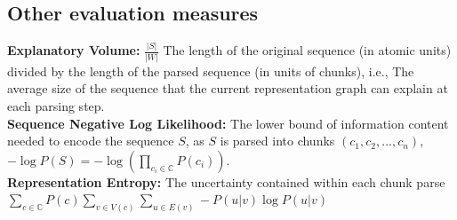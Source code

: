 \documentclass{article} %
\theoremstyle{remark}
\begin{document}

\subsection{Other evaluation measures}
\textbf{Explanatory Volume:} $\frac{|S|}{|W|}$ The length of the original sequence (in atomic units) divided by the length of the parsed sequence (in units of chunks), i.e., The average size of the sequence that the current representation graph can explain at each parsing step. \\ %
\textbf{Sequence Negative Log Likelihood:} The lower bound of information content needed to encode the sequence $S$, as $S$ is parsed into chunks $(c_1, c_2, ..., c_n)$, $-\log P(S) = -\log (\prod_{c_i \in \mathbb{C}} P(c_i))$.  \\
\textbf{Representation Entropy:} The uncertainty contained within each chunk parse $\sum_{c \in \mathbb{C}} P(c) \sum_{v \in V(c)} \sum_{u\in E(v)}-P(u|v)\log P(u|v)$\\



\end{document}
